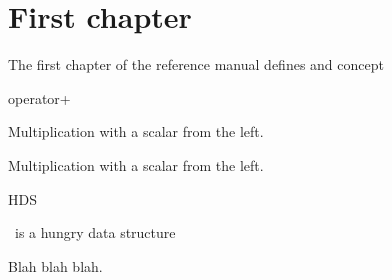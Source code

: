 \chapter{First chapter}

The first chapter of the reference manual defines 
and  concept

\gdef\ccTagOperatorLayout{\ccFalse}
\begin{ccRefFunction}{operator+}


       {Multiplication with a scalar from the left.}


       {Multiplication with a scalar from the left.}
\end{ccRefFunction}

\begin{ccRefConcept}{HDS}

\ccDefinition
\ccRefName\ is a hungry data structure

Blah blah blah.
\end{ccRefConcept}

